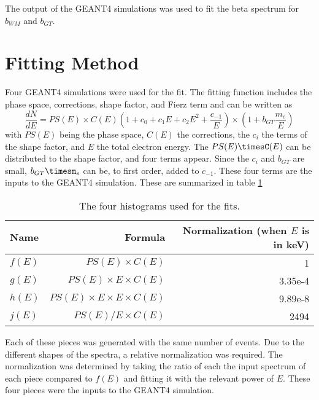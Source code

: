 \documentclass[../MaxHughesThesis.tex]{subfiles}
\begin{document}
The output of the GEANT4 simulations was used to fit the beta spectrum for $b_{WM}$ and $b_{GT}$.

\section{Fitting Method}
Four GEANT4 simulations were used for the fit.
The fitting function includes the phase space, corrections, shape factor, and Fierz term and can be written as
\begin{equation}
	\frac{dN}{dE}= PS(E) \times C(E) (1 + c_{0} + c_{1} E + c_{2} E^{2} + \frac{c_{-1}}{E}) \times (1 + b_{GT}\frac{m_{e}}{E})
	\label{eq:betaspecwshape}
\end{equation}
with $PS(E)$ being the phase space, $C(E)$ the corrections, the $c_{i}$ the terms of the shape factor, and $E$ the total electron energy. 
The $PS(E)\timesC(E)$ can be distributed to the shape factor, and four terms appear.
Since the $c_{i}$ and $b_{GT}$ are small, $b_{GT}\timesm_{e}$ can be, to first order, added to $c_{-1}$. 
These four terms are the inputs to the GEANT4 simulation.
These are summarized in table \ref{tab:4histfit}

\begin{table}[!hbt]
	\centering
	\caption{The four histograms used for the fits.}
		\begin{tabular}{lrr}
		Name & Formula & Normalization (when $E$ is in keV) \\ \hline
		$f(E)$ & $PS(E) \times C(E)$ & 1 \\
		$g(E)$ & $PS(E) \times E \times C(E)$ & 3.35e-4 \\
		$h(E)$ &  $PS(E)  \times E \times E \times C(E)$ & 9.89e-8 \\
		$j(E)$ &  $PS(E)/E \times C(E)$ & 2494 
		\end{tabular}
		\label{tab:4histfit}
\end{table}

Each of these pieces was generated with the same number of events.
Due to the different shapes of the spectra, a relative normalization was required.
The normalization was determined by taking the ratio of each the input spectrum of each piece compared to $f(E)$ and fitting it with the relevant power of $E$. 
These four pieces were the inputs to the GEANT4 simulation.
\end{document}
